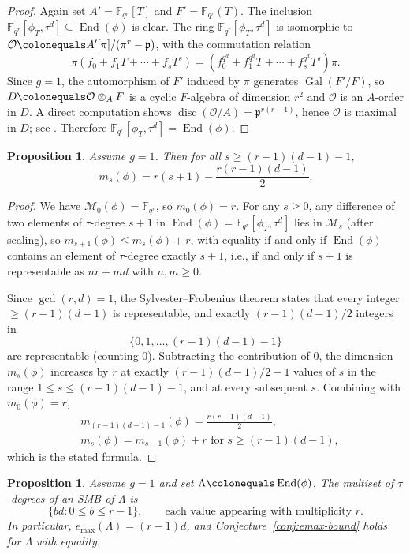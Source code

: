 \documentclass[12pt]{amsart}
\newtheorem{prop}[thm]{Proposition}
\theoremstyle{definition}
\theoremstyle{remark}
\numberwithin{equation}{section}
\numberwithin{thm}{section}
\DeclareMathOperator{\End}{End}
\DeclareMathOperator{\Gal}{Gal}
\DeclareMathOperator{\disc}{disc}
\newcommand{\fp}{\mathfrak{p}}
\newcommand{\cM}{\mathcal{M}}
\newcommand{\cO}{\mathcal{O}}
\newcommand{\F}{\mathbb{F}}
\newcommand{\La}{\Lambda}
\begin{document}
\begin{proof}
	Again set $A' = \F_{q^r}[T]$ and $F' = \F_{q^r}(T)$. The inclusion $\F_{q^r}[\phi_T,\tau^d]\subseteq \End(\phi)$ is clear. The ring $\F_{q^r}[\phi_T,\tau^d]$ is isomorphic to $\cO\colonequals A'[\pi]/(\pi^r - \fp)$, with the commutation relation
	\[
	\pi(f_0 + f_1 T + \cdots + f_s T^s) = (f_0^{q^d} + f_1^{q^d}T + \cdots + f_s^{q^d}T^s)\pi.
	\]
	Since $g = 1$, the automorphism of $F'$ induced by $\pi$ generates $\Gal(F'/F)$, so $D\colonequals \cO\otimes_A F$ is a cyclic $F$-algebra of dimension $r^2$ and $\cO$ is an $A$-order in $D$. A direct computation shows $\disc(\cO/A) = \fp^{r(r-1)}$, hence $\cO$ is maximal in $D$; see \cite[Sec.~6]{BG}. Therefore $\F_{q^r}[\phi_T,\tau^d] = \End(\phi)$.
\end{proof}

\begin{prop}\label{proptaur}
	Assume $g = 1$. Then for all $s\geq (r-1)(d-1) - 1$,
	\[
	m_s(\phi) = r(s+1) - \frac{r(r-1)(d-1)}{2}.
	\]
\end{prop}

\begin{proof}
	We have $\cM_0(\phi) = \F_{q^r}$, so $m_0(\phi) = r$. For any $s\geq 0$, any difference of two elements of $\tau$-degree $s+1$ in $\End(\phi) = \F_{q^r}[\phi_T,\tau^d]$ lies in $\cM_s$ (after scaling), so $m_{s+1}(\phi) \leq m_s(\phi) + r$, with equality if and only if $\End(\phi)$ contains an element of $\tau$-degree exactly $s+1$, i.e., if and only if $s+1$ is representable as $nr + md$ with $n,m\geq 0$.
	
	Since $\gcd(r,d) = 1$, the Sylvester--Frobenius theorem \cite{Sylvester1884} states that every integer $\geq (r-1)(d-1)$ is representable, and exactly $(r-1)(d-1)/2$ integers in \[\{0,1,\ldots,(r-1)(d-1)-1\}\] are representable (counting $0$). Subtracting the contribution of $0$, the dimension $m_s(\phi)$ increases by $r$ at exactly $(r-1)(d-1)/2 - 1$ values of $s$ in the range $1 \leq s \leq (r-1)(d-1) - 1$, and at every subsequent $s$. Combining with $m_0(\phi) = r$,
	\begin{align*}
			&m_{(r-1)(d-1)-1}(\phi) = \frac{r(r-1)(d-1)}{2},\\
		& m_s(\phi) = m_{s-1}(\phi) + r \text{ for } s\geq (r-1)(d-1),
	\end{align*}
	which is the stated formula.
\end{proof}

\begin{prop}\label{prop:phi-vanishing}
	Assume $g = 1$ and set $\La \colonequals \End(\phi)$. The multiset of $\tau$-degrees of an SMB of $\La$ is
	\[
	\{bd : 0\leq b\leq r-1\}, \qquad \text{each value appearing with multiplicity } r.
	\]
	In particular, $e_{\max}(\La) = (r-1)d$, and Conjecture~\ref{conj:emax-bound} holds for $\La$ with equality.
\end{prop}
\end{document}
